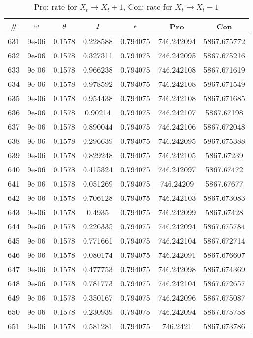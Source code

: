 \newpage
\begin{table}
\caption{Pro: rate for $X_t \rightarrow X_t + 1$, Con: rate for $X_t \rightarrow X_t - 1$}
\begin{tabular*}{\linewidth}{c|c|c|c|c|c|c}
\# & $\omega$ & $\theta$ & $I$ & $\epsilon$ & Pro & Con \\
\hline
631 & 9e-06 & 0.1578 & 0.228588 & 0.794075 & 746.242094 & 5867.675772\\
632 & 9e-06 & 0.1578 & 0.327311 & 0.794075 & 746.242095 & 5867.675216\\
633 & 9e-06 & 0.1578 & 0.966238 & 0.794075 & 746.242108 & 5867.671619\\
634 & 9e-06 & 0.1578 & 0.978592 & 0.794075 & 746.242108 & 5867.671549\\
635 & 9e-06 & 0.1578 & 0.954438 & 0.794075 & 746.242108 & 5867.671685\\
636 & 9e-06 & 0.1578 & 0.90214 & 0.794075 & 746.242107 & 5867.67198\\
637 & 9e-06 & 0.1578 & 0.890044 & 0.794075 & 746.242106 & 5867.672048\\
638 & 9e-06 & 0.1578 & 0.296639 & 0.794075 & 746.242095 & 5867.675388\\
639 & 9e-06 & 0.1578 & 0.829248 & 0.794075 & 746.242105 & 5867.67239\\
640 & 9e-06 & 0.1578 & 0.415324 & 0.794075 & 746.242097 & 5867.67472\\
641 & 9e-06 & 0.1578 & 0.051269 & 0.794075 & 746.24209 & 5867.67677\\
642 & 9e-06 & 0.1578 & 0.706128 & 0.794075 & 746.242103 & 5867.673083\\
643 & 9e-06 & 0.1578 & 0.4935 & 0.794075 & 746.242099 & 5867.67428\\
644 & 9e-06 & 0.1578 & 0.226335 & 0.794075 & 746.242094 & 5867.675784\\
645 & 9e-06 & 0.1578 & 0.771661 & 0.794075 & 746.242104 & 5867.672714\\
646 & 9e-06 & 0.1578 & 0.080174 & 0.794075 & 746.242091 & 5867.676607\\
647 & 9e-06 & 0.1578 & 0.477753 & 0.794075 & 746.242098 & 5867.674369\\
648 & 9e-06 & 0.1578 & 0.781773 & 0.794075 & 746.242104 & 5867.672657\\
649 & 9e-06 & 0.1578 & 0.350167 & 0.794075 & 746.242096 & 5867.675087\\
650 & 9e-06 & 0.1578 & 0.230939 & 0.794075 & 746.242094 & 5867.675758\\
651 & 9e-06 & 0.1578 & 0.581281 & 0.794075 & 746.2421 & 5867.673786\\

\end{tabular*}
\end{table}
